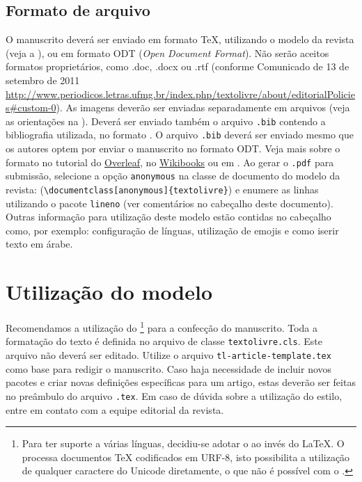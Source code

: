 \documentclass{textolivre}
\begin{document}
\subsection{Formato de arquivo}\label{sec-formato}
O manuscrito deverá ser enviado em formato \TeX{}, utilizando o modelo da revista (veja a ),
ou em formato ODT (\emph{Open Document Format}). Não serão aceitos formatos proprietários, como .doc, .docx ou .rtf
(conforme Comunicado de 13 de setembro de 2011 \url{http://www.periodicos.letras.ufmg.br/index.php/textolivre/about/editorialPolicies#custom-0}). 
As imagens deverão ser enviadas separadamente em arquivos (veja as orientações na ).
Deverá ser enviado também o arquivo \texttt{.bib} contendo a bibliografia utilizada, no formato .
O arquivo \texttt{.bib} deverá ser enviado mesmo que os autores optem por enviar o manuscrito no formato ODT.
Veja mais sobre o formato  no tutorial do \href{https://www.overleaf.com/learn/latex/Bibliography_management_in_LaTeX#The_bibliography_file}{Overleaf},
no \href{https://en.wikibooks.org/wiki/LaTeX/Bibliography_Management}{Wikibooks} ou em \textcite{araujo2020}.
Ao gerar o \texttt{.pdf} para submissão, selecione a opção \texttt{anonymous} na classe de documento do modelo da revista:
(\verb|\documentclass[anonymous]{textolivre}|) e enumere as linhas utilizando o pacote \texttt{lineno} (ver comentários
no cabeçalho deste documento). Outras informação para utilização deste modelo estão contidas no cabeçalho como, por exemplo:
configuração de línguas, utilização de emojis e como iserir texto em árabe.



\section{Utilização do modelo}\label{sec-modelo}
Recomendamos a utilização do \footnote{
Para ter suporte a várias línguas, decidiu-se adotar o  ao invés do \LaTeX{}.
O  processa documentos \TeX{} codificados em URF-8, isto possibilita 
a utilização de qualquer caractere do Unicode diretamente, o que não é possível com o .  
} para a confecção do manuscrito.
Toda a formatação do texto é definida no arquivo de classe \texttt{textolivre.cls}. 
Este arquivo não deverá ser editado. 
Utilize o arquivo \texttt{tl-article-template.tex} como base para redigir o manuscrito.
Caso haja necessidade de incluir novos pacotes e criar novas definições específicas para um artigo, 
estas deverão ser feitas no preâmbulo do arquivo \texttt{.tex}. 
Em caso de dúvida sobre a utilização do estilo, entre em contato com a equipe editorial da revista.
\end{document}
